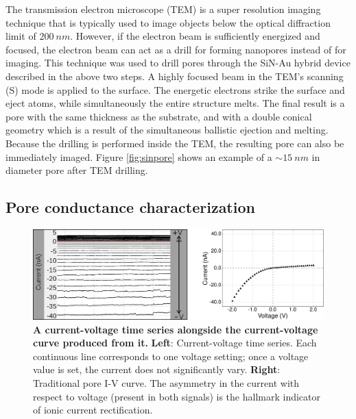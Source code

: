 		
			The transmission electron microscope (TEM) is a super resolution imaging technique that is typically used to image objects below the optical diffraction limit of $\SI{200}{nm}$. However, if the electron beam is sufficiently energized and focused, the electron beam can act as a drill for forming nanopores instead of for imaging. This technique was used to drill pores through the SiN-Au hybrid device described in the above two steps. A highly focused beam in the TEM's scanning (S) mode is applied to the surface. The energetic electrons strike the surface and eject atoms, while simultaneously the entire structure melts. The final result is a pore with the same thickness as the substrate, and with a double conical geometry which is a result of the simultaneous ballistic ejection and melting. Because the drilling is performed inside the TEM, the resulting pore can also be immediately imaged. Figure \ref{fig:sinpore} shows an example of a $\sim\SI{15}{nm}$ in diameter pore after TEM drilling.
			
		\subsection{Pore conductance characterization}
		
			\begin{figure}
				\includegraphics[width=\textwidth]{siniv.png}
				\caption{\textbf{A current-voltage time series alongside the current-voltage curve produced from it.} \textbf{Left}: Current-voltage time series. Each continuous line corresponds to one voltage setting; once a voltage value is set, the current does not significantly vary. \textbf{Right}: Traditional pore I-V curve. The asymmetry in the current with respect to voltage (present in both signals) is the hallmark indicator of ionic current rectification.}
				\label{fig:siniv}
			\end{figure}

